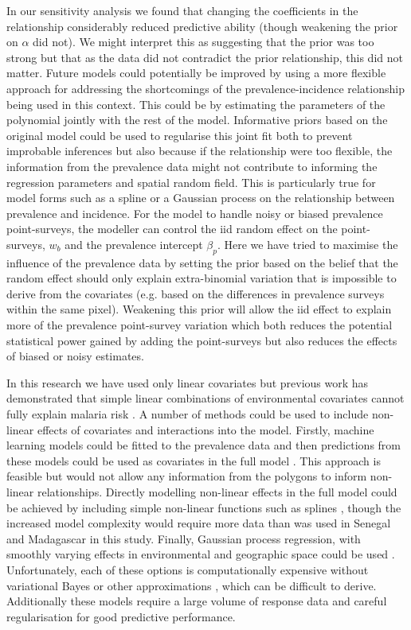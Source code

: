 \documentclass{statsoc}
\begin{document}
In our sensitivity analysis we found that changing the coefficients in the relationship considerably reduced predictive ability (though weakening the prior on $\alpha$ did not). 
We might interpret this as suggesting that the prior was too strong but that as the data did not contradict the prior relationship, this did not matter.
Future models could potentially be improved by using a more flexible approach for addressing the shortcomings of the prevalence-incidence relationship \citep{cameron2015defining} being used in this context.
This could be by estimating the parameters of the polynomial jointly with the rest of the model.
Informative priors based on the original model could be used to regularise this joint fit both to prevent improbable inferences but also because if the relationship were too flexible, the information from the prevalence data might not contribute to informing the regression parameters and spatial random field.
This is particularly true for model forms such as a spline or a Gaussian process on the relationship between prevalence and incidence.
For the model to handle noisy or biased prevalence point-surveys, the modeller can control the iid random effect on the point-surveys, $w_b$ and the prevalence intercept $\beta_p$. 
Here we have tried to maximise the influence of the prevalence data by setting the prior based on the belief that the random effect should only explain extra-binomial variation that is impossible to derive from the covariates (e.g. based on the differences in prevalence surveys within the same pixel).
Weakening this prior will allow the iid effect to explain more of the prevalence point-survey variation which both reduces the potential statistical power gained by adding the point-surveys but also reduces the effects of biased or noisy estimates.

In this research we have used only linear covariates but previous work has demonstrated that simple linear combinations of environmental covariates cannot fully explain malaria risk \citep{bhatt2017improved}.
A number of methods could be used to include non-linear effects of covariates and interactions into the model.
Firstly, machine learning models could be fitted to the prevalence data and then predictions from these models could be used as covariates in the full model \citep{bhatt2017improved, lucas2020improving}.
This approach is feasible but would not allow any information from the polygons to inform non-linear relationships.
Directly modelling non-linear effects in the full model could be achieved by including simple non-linear functions such as splines \citep{sissoko2017temporal, sewe2017using, hundessa2018projecting}, though the increased model complexity would require more data than was used in Senegal and Madagascar in this study.
Finally, Gaussian process regression, with smoothly varying effects in environmental and geographic space could be used \citep{law2018variational}.
Unfortunately, each of these options is computationally expensive without variational Bayes or other approximations \citep{law2018variational, ton2018spatial}, which can be difficult to derive.
Additionally these models require a large volume of response data and careful regularisation for good predictive performance.
\end{document}

